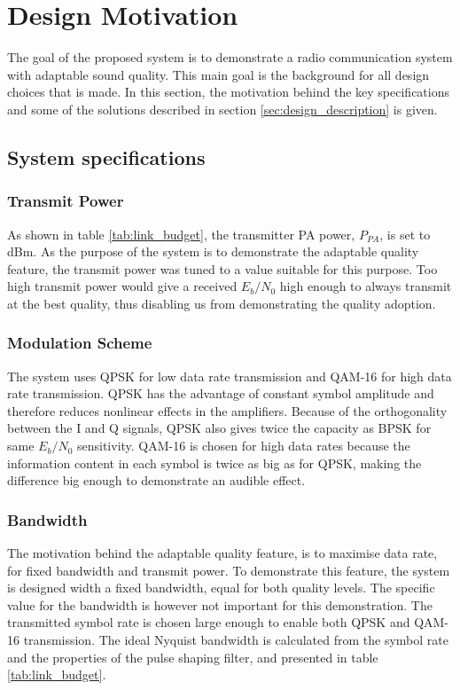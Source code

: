 \section{Design Motivation}
\label{sec:design_motivation}
The goal of the proposed system is to demonstrate a radio communication system with adaptable sound quality. This main goal is the background for all design choices that is made. In this section, the motivation behind the key specifications and some of the solutions described in section \ref{sec:design_description} is given.

\subsection{System specifications}
\subsubsection{Transmit Power}
As shown in table \ref{tab:link_budget}, the transmitter PA power, $P_{PA}$, is set to \paPower dBm. As the purpose of the system is to demonstrate the adaptable quality feature, the transmit power was tuned to a value suitable for this purpose. Too high transmit power would give a received $E_b/N_0$ high enough to always transmit at the best quality, thus disabling us from demonstrating the quality adoption. 

\subsubsection{Modulation Scheme}
The system uses QPSK for low data rate transmission and QAM-16 for high data rate transmission. QPSK has the advantage of constant symbol amplitude and therefore reduces nonlinear effects in the amplifiers. Because of the orthogonality between the I and Q signals, QPSK also gives twice the capacity as BPSK for same $E_b/N_0$ sensitivity. QAM-16 is chosen for high data rates because the information content in each symbol is twice as big as for QPSK, making the difference big enough to demonstrate an audible effect.

\subsubsection{Bandwidth}
The motivation behind the adaptable quality feature, is to maximise data rate, for fixed bandwidth and transmit power. To demonstrate this feature, the system is designed width a fixed bandwidth, equal for both quality levels. The specific value for the bandwidth is however not important for this demonstration. The transmitted symbol rate is chosen large enough to enable both QPSK and QAM-16 transmission. The ideal Nyquist bandwidth is calculated from the symbol rate and the properties of the pulse shaping filter, and presented in table \ref{tab:link_budget}. 


